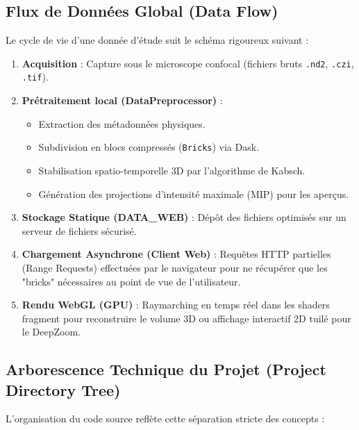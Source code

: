 \subsection{Flux de Données Global (Data Flow)}
Le cycle de vie d'une donnée d'étude suit le schéma rigoureux suivant :
\begin{enumerate}
    \item \textbf{Acquisition} : Capture sous le microscope confocal (fichiers bruts \texttt{.nd2}, \texttt{.czi}, \texttt{.tif}).
    \item \textbf{Prétraitement local (DataPreprocessor)} :
    \begin{itemize}
        \item Extraction des métadonnées physiques.
        \item Subdivision en blocs compressés (\texttt{Bricks}) via Dask.
        \item Stabilisation spatio-temporelle 3D par l'algorithme de Kabsch.
        \item Génération des projections d'intensité maximale (MIP) pour les aperçus.
    \end{itemize}
    \item \textbf{Stockage Statique (DATA\_WEB)} : Dépôt des fichiers optimisés sur un serveur de fichiers sécurisé.
    \item \textbf{Chargement Asynchrone (Client Web)} : Requêtes HTTP partielles (Range Requests) effectuées par le navigateur pour ne récupérer que les "bricks" nécessaires au point de vue de l'utilisateur.
    \item \textbf{Rendu WebGL (GPU)} : Raymarching en temps réel dans les shaders fragment pour reconstruire le volume 3D ou affichage interactif 2D tuilé pour le DeepZoom.
\end{enumerate}

\subsection{Arborescence Technique du Projet (Project Directory Tree)}
L'organisation du code source reflète cette séparation stricte des concepts :

